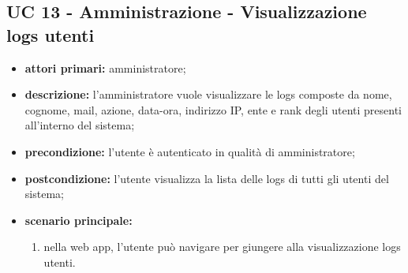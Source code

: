 		



		



		


		\subsection{UC 13 - Amministrazione - Visualizzazione logs utenti}
		\begin{itemize}
			\item \textbf{attori primari:} amministratore;
			\item \textbf{descrizione:} l'amministratore vuole visualizzare le logs composte da nome, cognome, mail, azione, data-ora, indirizzo IP, ente e rank degli utenti presenti all'interno del sistema;
			\item \textbf{precondizione:} l'utente è autenticato in qualità di amministratore;
			\item \textbf{postcondizione:} l'utente visualizza la lista delle logs di tutti gli utenti del sistema;
			\item \textbf{scenario principale:}
			\begin{enumerate}
				\item nella web app, l'utente può navigare per giungere alla visualizzazione logs utenti.
			\end{enumerate}
		\end{itemize}

